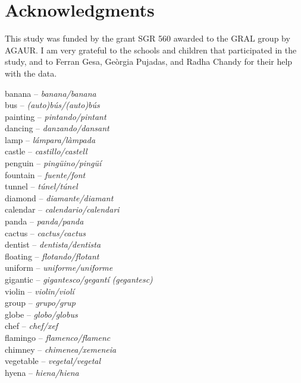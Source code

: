 \documentclass[output=paper,modfonts,nonflat,newtxmath]{langsci/langscibook}
\begin{document}
\section*{Acknowledgments}

{This study was funded by the grant SGR 560 awarded to the GRAL group by AGAUR. I am very grateful to the schools and children that participated in the study, and to Ferran Gesa, Geòrgia Pujadas, and Radha Chandy for their help with the data.}



\begin{multicols}{2}\noindent
banana  – \textit{banana/banana} \\
bus  – \textit{(auto)bús/(auto)bús}\\
painting  – \textit{pintando/pintant}\\
dancing  – \textit{danzando/dansant}\\
lamp  – \textit{lámpara/làmpada}\\
castle  – \textit{castillo/castell}\\
penguin  – \textit{pingüino/pingüí}\\
fountain  – \textit{fuente/font}\\
tunnel  – \textit{túnel/túnel} \\
diamond  – \textit{diamante/diamant} \\
calendar  – \textit{calendario/calendari} \\
panda  – \textit{panda/panda}\\
cactus  – \textit{cactus/cactus}\\
dentist  – \textit{dentista/dentista} \\
floating  – \textit{flotando/flotant} \\
uniform  – \textit{uniforme/uniforme} \\
gigantic  – \textit{gigantesco/gegantí} \textit{(gegantesc)}\\
violin  – \textit{violin/violí} \\
group  – \textit{grupo/grup} \\
globe  – \textit{globo/globus} \\
chef  – \textit{chef/xef} \\
flamingo  – \textit{flamenco/flamenc} \\
chimney  – \textit{chimenea/xemeneia} \\
vegetable  – \textit{vegetal/vegetal} \\
hyena  – \textit{hiena/hiena} \\

\end{multicols}
\end{document}
